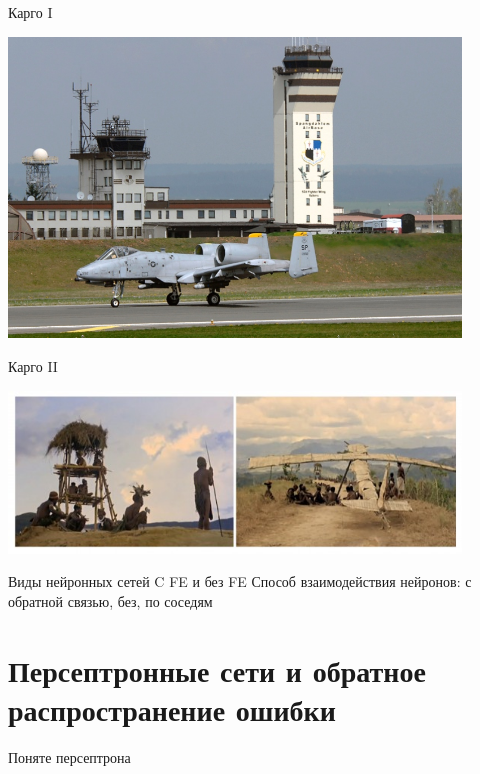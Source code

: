 \documentclass[14pt, fleqn, xcolor={dvipsnames, table}]{beamer}
\begin{document}
\begin{frame}{Карго I}
\begin{center}
\includegraphics[width=0.9\textwidth]{good_cargo}
\end{center}
\end{frame}


\begin{frame}{Карго II}
\begin{center}
\includegraphics[width=0.9\textwidth]{cult_cargo}
\end{center}
\end{frame}


\begin{frame}{Виды нейронных сетей}
C FE и без FE
Способ взаимодействия нейронов: с обратной связью, без, по соседям

\end{frame}

\section{Персептронные сети и обратное распространение ошибки} %
\begin{frame}{Поняте персептрона}
\end{frame}
\end{document}
